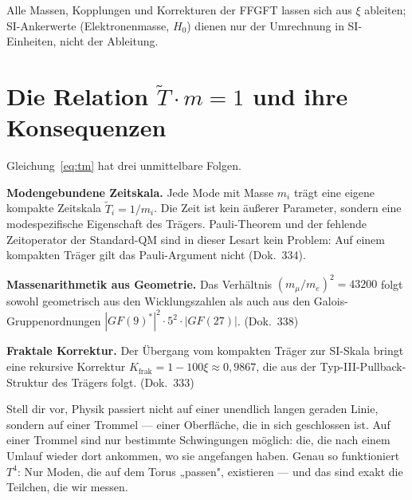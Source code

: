 Alle Massen, Kopplungen und Korrekturen der FFGFT lassen sich aus $\xi$
ableiten; SI-Ankerwerte (Elektronenmasse, $H_0$) dienen nur der
Umrechnung in SI-Einheiten, nicht der Ableitung.

\section{Die Relation $\tilde T\cdot m = 1$ und ihre Konsequenzen}

Gleichung~\eqref{eq:tm} hat drei unmittelbare Folgen.

\textbf{Modengebundene Zeitskala.} Jede Mode mit Masse $m_i$ trägt
eine eigene kompakte Zeitskala $\tilde T_i = 1/m_i$. Die Zeit
ist kein äußerer Parameter, sondern eine modespezifische Eigenschaft des
Trägers. Pauli-Theorem und der fehlende Zeitoperator der Standard-QM
sind in dieser Lesart kein Problem: Auf einem kompakten Träger gilt das
Pauli-Argument nicht (Dok.~334).

\textbf{Massenarithmetik aus Geometrie.} Das Verhältnis
$(m_\mu/m_e)^2 = 43200$ folgt sowohl geometrisch aus den
Wicklungszahlen als auch aus den Galois-Gruppenordnungen
$|GF(9)^*|^2\cdot 5^2\cdot|GF(27)|$. (Dok.~338)

\textbf{Fraktale Korrektur.} Der Übergang vom kompakten Träger zur
SI-Skala bringt eine rekursive Korrektur
$K_{\mathrm{frak}} = 1 - 100\xi \approx 0{,}9867$, die aus der
Typ-III-Pullback-Struktur des Trägers folgt. (Dok.~333)

\begin{laierspur}
Stell dir vor, Physik passiert nicht auf einer unendlich langen
geraden Linie, sondern auf einer Trommel — einer Oberfläche, die
in sich geschlossen ist. Auf einer Trommel sind nur bestimmte
Schwingungen möglich: die, die nach einem Umlauf wieder dort
ankommen, wo sie angefangen haben. Genau so funktioniert $T^4$:
Nur Moden, die auf dem Torus „passen", existieren — und das sind
exakt die Teilchen, die wir messen.
\end{laierspur}
